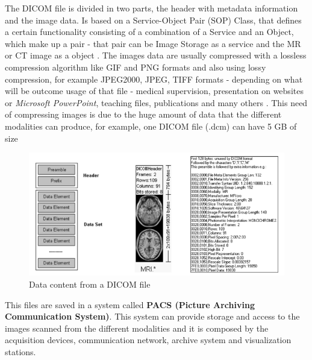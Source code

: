 \documentclass[mim_thesis.tex]{subfiles}
\begin{document}
The DICOM file is divided in two parts, the header with metadata information and the image data. Is based on a Service-Object Pair (SOP) Class, that defines a certain functionality consisting of a combination of a Service and an Object, which make up a pair - that pair can be Image Storage as a service and the MR or CT image as a object \citep{DICOM2018}. The images data are usually compressed with a lossless compression algorithm like GIF and PNG formats and also using lossy compression, for example JPEG2000, JPEG, TIFF formats - depending on what will be outcome usage of that file - medical supervision, presentation on websites or \textit{Microsoft PowerPoint}, teaching files, publications and many others \citep{varma2013}. This need of compressing images is due to the huge amount of data that the different modalities can produce, for example, one DICOM file (.dcm) can have 5 GB of size

\begin{figure}[H]
	\centering
    \includegraphics[width=1\textwidth]{img/data_dicom_file.PNG}
	\caption{Data content from a DICOM file}
	\label{fig:data_dicom_file}
\end{figure}


This files are saved in a system called \textbf{PACS (Picture Archiving Communication System)}. This system can provide storage and access to the images scanned from the different modalities and it is composed by the acquisition devices, communication network, archive system and visualization stations.
\end{document}
